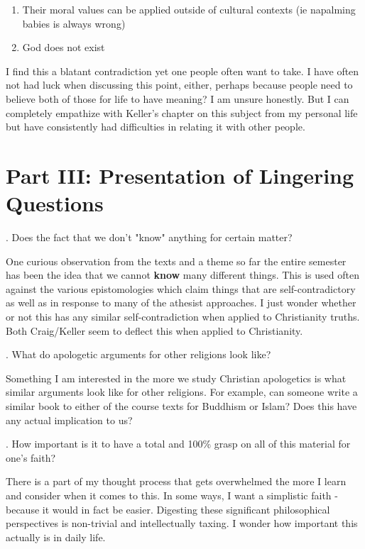 \documentclass[12pt]{turabian-researchpaper}
\begin{document}
\begin{enumerate}
\item Their moral values can be applied outside of cultural contexts (ie napalming babies is always wrong)
\item God does not exist
\end{enumerate}

I find this a blatant contradiction yet one people often want to take. I have often not had luck when discussing this point, either, perhaps because people need to believe both of those for life to have meaning? I am unsure honestly. But I can completely empathize with Keller's chapter on this subject from my personal life but have consistently had difficulties in relating it with other people.

\section{Part III: Presentation of Lingering Questions}

. Does the fact that we don't "know" anything for certain matter?

One curious observation from the texts and a theme so far the entire semester has been the idea that we cannot \textbf{know} many different things. This is used often against the various epistomologies which claim things that are self-contradictory as well as in response to many of the athesist approaches. I just wonder whether or not this has any similar self-contradiction when applied to Christianity truths. Both Craig/Keller seem to deflect this when applied to Christianity.

. What do apologetic arguments for other religions look like?

Something I am interested in the more we study Christian apologetics is what similar arguments look like for other religions. For example, can someone write a similar book to either of the course texts for Buddhism or Islam? Does this have any actual implication to us?

. How important is it to have a total and 100\% grasp on all of this material for one's faith?

There is a part of my thought process that gets overwhelmed the more I learn and consider when it comes to this. In some ways, I want a simplistic faith - because it would in fact be easier. Digesting these significant philosophical perspectives is non-trivial and intellectually taxing. I wonder how important this actually is in daily life.

\newpage
\printbibliography
\end{document}
